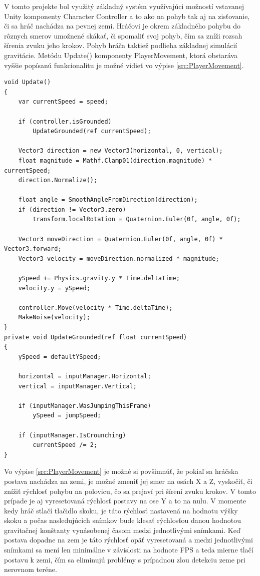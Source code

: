 \documentclass[slovak, master]{diploma}
\begin{document}
V tomto projekte bol využitý základný systém využívajúci možností vstavanej Unity komponenty Character Controller a to ako na pohyb tak aj na zisťovanie, či sa hráč nachádza na pevnej zemi. Hráčovi je okrem základného pohybu do rôznych smerov umožnené skákať, či spomaliť svoj pohyb, čím sa zníži rozsah šírenia zvuku jeho krokov. Pohyb hráča taktiež podlieha základnej simulácií gravitácie. Metódu Update() komponenty PlayerMovement, ktorá obstaráva vyššie popísanú funkcionalitu je možné vidieť vo výpise \ref{src:PlayerMovement}.

\vspace{8pt}
\begin{lstlisting}[label=src:PlayerMovement,caption={Metódy komponenty PlayerMovement obstarávajúce pohyb hráčskej postavy}]
void Update()
{
    var currentSpeed = speed;

    if (controller.isGrounded)
        UpdateGrounded(ref currentSpeed);

    Vector3 direction = new Vector3(horizontal, 0, vertical);
    float magnitude = Mathf.Clamp01(direction.magnitude) * currentSpeed;
    direction.Normalize();

    float angle = SmoothAngleFromDirection(direction);
    if (direction != Vector3.zero)
        transform.localRotation = Quaternion.Euler(0f, angle, 0f);

    Vector3 moveDirection = Quaternion.Euler(0f, angle, 0f) * Vector3.forward;
    Vector3 velocity = moveDirection.normalized * magnitude;

    ySpeed += Physics.gravity.y * Time.deltaTime;
    velocity.y = ySpeed;

    controller.Move(velocity * Time.deltaTime);
    MakeNoise(velocity);
}
private void UpdateGrounded(ref float currentSpeed)
{
    ySpeed = defaultYSpeed;

    horizontal = inputManager.Horizontal;
    vertical = inputManager.Vertical;

    if (inputManager.WasJumpingThisFrame)
        ySpeed = jumpSpeed;

    if (inputManager.IsCrounching)
        currentSpeed /= 2;
}
\end{lstlisting}

Vo výpise \ref{src:PlayerMovement} je možné si povšimnúť, že pokiaľ sa hráčska postava nachádza na zemi, je možné zmeniť jej smer na osách X a Z, vyskočiť, či znížiť rýchlosť pohybu na polovicu, čo sa prejaví pri šírení zvuku krokov. V tomto prípade je aj vyresetovaná rýchlosť postavy na ose Y a to na nulu. V momente kedy hráč stlačí tlačidlo skoku, je táto rýchlosť nastavená na hodnotu výšky skoku a počas nasledujúcich snímkov bude klesať rýchlosťou danou hodnotou gravitačnej konštanty vynásobenej časom medzi jednotlivými snímkami. Keď postava dopadne na zem je táto rýchlosť opäť vyresetovaná a medzi jednotlivými snímkami sa mení len minimálne v závislosti na hodnote FPS a teda mierne tlačí postavu k zemi, čím sa eliminujú problémy s prípadnou zlou detekciu zeme pri nerovnom teréne.
\end{document}
